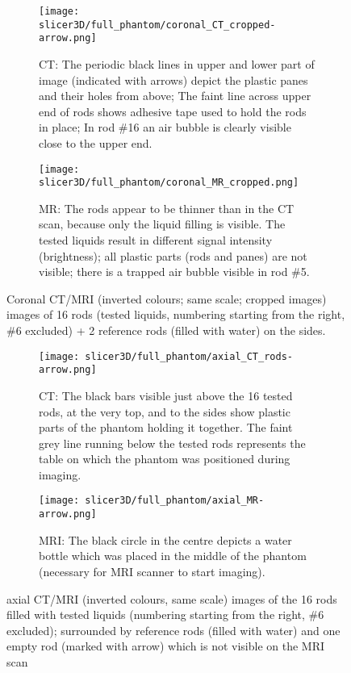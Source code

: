 \begin{figure}[!tbp]
  \begin{subfigure}[b]{\textwidth}
    \texttt{[image: slicer3D/full\_phantom/coronal\_CT\_cropped-arrow.png]}
    \caption{CT: The periodic black lines in upper and lower part of image (indicated with arrows) depict the plastic panes and their holes from above; The faint line across upper end of rods shows adhesive tape used to hold the rods in place; In rod \#16 an air bubble is clearly visible close to the upper end.}
    \label{fig:coronal_CT}
  \end{subfigure}
  \begin{subfigure}[b]{1\textwidth}
    \texttt{[image: slicer3D/full\_phantom/coronal\_MR\_cropped.png]}
    \caption{MR: The rods appear to be thinner than in the CT scan, because only the liquid filling is visible. The tested liquids result in different signal intensity (brightness); all plastic parts (rods and panes) are not visible; there is a trapped air bubble visible in rod \#5.}
    \label{fig:coronal_MR}
  \end{subfigure}
  \caption{Coronal CT/MRI (inverted colours; same scale; cropped images) images of 16 rods (tested liquids, numbering starting from the right, \#6 excluded) + 2 reference rods (filled with water) on the sides.}
  \label{fig:coronal}
\end{figure}

\begin{figure}[!tbp]
  \begin{subfigure}[b]{\textwidth}
    \texttt{[image: slicer3D/full\_phantom/axial\_CT\_rods-arrow.png]}
    \caption{CT: The black bars visible just above the 16 tested rods, at the very top, and to the sides show plastic parts of the phantom holding it together. The faint grey line running below the tested rods represents the table on which the phantom was positioned during imaging.}
    \label{fig:axial_CT_rods}
  \end{subfigure}
  \begin{subfigure}[b]{\textwidth}
    \texttt{[image: slicer3D/full\_phantom/axial\_MR-arrow.png]}
    \caption{MRI: The black circle in the centre depicts a water bottle which was placed in the middle of the phantom (necessary for MRI scanner to start imaging).}
    \label{fig:axial_MR}
  \end{subfigure}
  \caption{axial CT/MRI (inverted colours, same scale) images of the 16 rods filled with tested liquids (numbering starting from the right, \#6 excluded); surrounded by reference rods (filled with water) and one empty rod (marked with arrow) which is not visible on the MRI scan}
  \label{fig:axial}
\end{figure}


